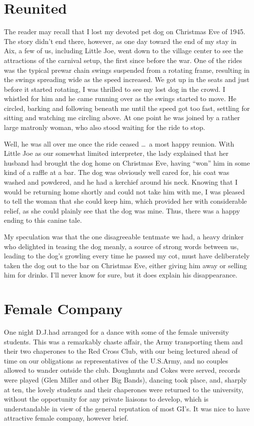 \documentclass[../m3y]{subfiles}
\begin{document}
\section{Reunited}
\label{reunited}
The reader may recall that I lost my devoted pet dog on Christmas Eve of 1945. The story didn't end there, however, as one day toward the end of my stay in Aix, a few of us, including Little Joe, went down to the village center to see the attractions of the carnival setup, the first since before the war. One of the rides was the typical prewar chain swings suspended from a rotating frame, resulting in the swings spreading wide as the speed increased. We got up in the seats and just before it started rotating, I was thrilled to see my lost dog in the crowd. I whistled for him and he came running over as the swings started to move. He circled, barking and following beneath me until the speed got too fast, settling for sitting and watching me circling above. At one point he was joined by a rather large matronly woman, who also stood waiting for the ride to stop.

Well, he was all over me once the ride ceased \ldots\ a most happy reunion. With Little Joe as our somewhat limited interpreter, the lady explained that her husband had brought the dog home on Christmas Eve, having ``won'' him in some kind of a raffle at a bar. The dog was obviously well cared for, his coat was washed and powdered, and he had a kerchief around his neck. Knowing that I would be returning home shortly and could not take him with me, I was pleased to tell the woman that she could keep him, which provided her with considerable relief, as she could plainly see that the dog was mine. Thus, there was a happy ending to this canine tale.

My speculation was that the one disagreeable tentmate we had, a heavy drinker who delighted in teasing the dog meanly, a source of strong words between us, leading to the dog's growling every time he passed my cot, must have deliberately taken the dog out to the bar on Christmas Eve, either giving him away or selling him for drinks. I'll never know for sure, but it does explain his disappearance.

\section{Female Company}
One night D.J.\@ had arranged for a dance with some of the female university students. This was a remarkably chaste affair, the Army transporting them and their two chaperones to the Red Cross Club, with our being lectured ahead of time on our obligations as representatives of the U.S.\@ Army, and no couples allowed to wander outside the club. Doughnuts and Cokes were served, records were played (Glen Miller and other Big Bands), dancing took place, and, sharply at ten, the lovely students and their chaperones were returned to the university, without the opportunity for any private liaisons to develop, which is understandable in view of the general reputation of most GI's. It was nice to have attractive female company, however brief.
\end{document}
